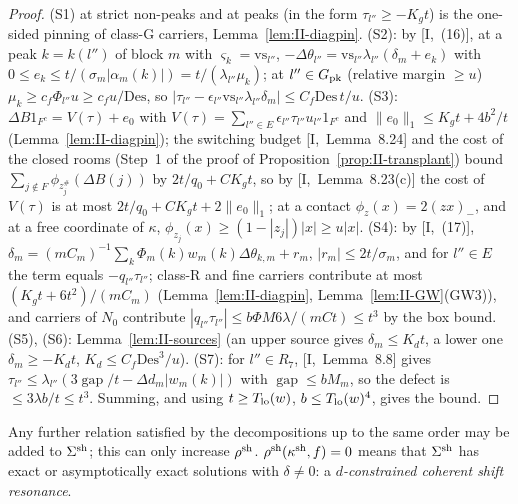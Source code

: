 \documentclass[10pt]{amsart}
\theoremstyle{definition}
\theoremstyle{remark}
\newcommand{\gap}{\operatorname{gap}}
\begin{document}
\begin{proof}
(S1) at strict non-peaks and at peaks (in the form $\tau_{l''}\ge-K_gt$) is
the one-sided pinning of class-G carriers, Lemma~\ref{lem:II-diagpin}.
(S2): by [I,~(16)], at a peak $k=k(l'')$ of block $m$ with $\varsigma_k=
\mathrm{vs}_{l''}$, $-\Delta\theta_{l''}=\mathrm{vs}_{l''}\lambda_{l''}(\delta_m+
e_k)$ with $0\le e_k\le t/(\sigma_m|\alpha_m(k)|)=t/(\lambda_{l''}\mu_k)$; at
$l''\in G_{\rm pk}$ (relative margin $\ge u$) $\mu_k\ge c_f\Phi_{l''}u\ge c_fu/
\mathrm{Des}$, so $|\tau_{l''}-\epsilon_{l''}\mathrm{vs}_{l''}\lambda_{l''}\delta_m|
\le C_f\mathrm{Des}\,t/u$.  (S3): $\Delta B1_{F^c}=V(\tau)+e_0$ with $V(\tau)=
\sum_{l''\in E}\epsilon_{l''}\tau_{l''}u_{l''}1_{F^c}$ and $\|e_0\|_1\le K_gt+
4b^2/t$ (Lemma~\ref{lem:II-diagpin}); the switching budget [I,~Lemma~8.24]
and the cost of the closed rooms (Step~1 of the proof of
Proposition~\ref{prop:II-transplant}) bound
$\sum_{j\notin F}\phi_{z^\#_j}(\Delta B(j))$ by $2t/q_0+CK_gt$, so by
[I,~Lemma~8.23(c)] the cost of $V(\tau)$ is at most $2t/q_0+CK_gt+2\|e_0\|_1$;
at a contact $\phi_z(x)=2(zx)_-$, and at a free coordinate of $\kappa$,
$\phi_{z_j}(x)\ge(1-|z_j|)|x|\ge u|x|$.  (S4): by [I,~(17)], $\delta_m=(mC_m)^{-1}
\sum_k\Phi_m(k)w_m(k)\Delta\theta_{k,m}+r_m$, $|r_m|\le2t/\sigma_m$, and for
$l''\in E$ the term equals $-q_{l''}\tau_{l''}$; class-R and fine carriers
contribute at most $(K_gt+6t^2)/(mC_m)$ (Lemma~\ref{lem:II-diagpin},
Lemma~\ref{lem:II-GW}(GW3)), and carriers of $N_0$ contribute $|q_{l''}
\tau_{l''}|\le b\Phi M6\lambda/(mCt)\le t^3$ by the box bound.  (S5), (S6):
Lemma~\ref{lem:II-sources} (an upper source gives $\delta_m\le K_dt$, a
lower one $\delta_m\ge-K_dt$, $K_d\le C_f\mathrm{Des}^3/u$).  (S7): for
$l''\in R_7$, [I,~Lemma~8.8] gives $\tau_{l''}\le\lambda_{l''}(3\gap/t-\Delta
d_m|w_m(k)|)$ with $\gap\le bM_m$, so the defect is $\le3\lambda b/t\le t^3$.
Summing, and using $t\ge T_{\rm lo}(w)$, $b\le T_{\rm lo}(w)^4$, gives the
bound.
\end{proof}

Any further relation satisfied by the decompositions up to the same order
may be added to $\Sigma^{\rm sh}$; this can only increase $\rho^{\rm sh}$.
$\rho^{\rm sh}(\kappa^{\rm sh},f)=0$ means that $\Sigma^{\rm sh}$ has exact or
asymptotically exact solutions with $\delta\ne0$: a \emph{$d$-constrained
coherent shift resonance}.
\end{document}
